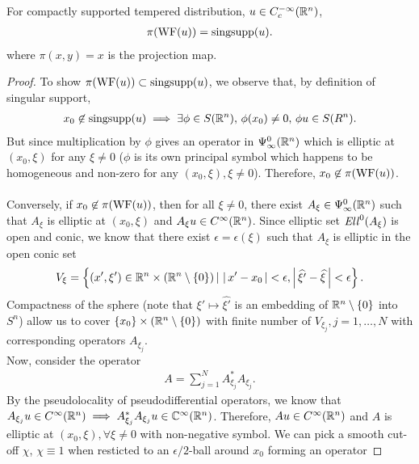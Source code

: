 \documentclass[12pt]{article}
\begin{document}
\begin{fprop}
    For compactly supported tempered distribution, $u \in C^{-\infty}_c({\mathbb R}^n)$, 
    \begin{align*}
    \pi(\mathrm{WF}(u)) = \mathrm{singsupp}(u). 
    \end{align*}
    where $\pi(x, y) = x$ is the projection map. 
\end{fprop}
\begin{proof}
    To show $\pi(\mathrm{WF}(u)) \subset \mathrm{singsupp}(u)$, we observe that, by definition of singular support, 
    \begin{align*}
    x_0 \not \in \mathrm{singsupp}(u) \implies \exists \phi \in S({\mathbb R}^n), \, \phi(x_0) \neq 0, \, \phi u \in S(R^n). 
    \end{align*}
    But since multiplication by $\phi$ gives an operator in $\Psi^0_\infty({\mathbb R}^n)$ which is elliptic at $(x_0, \xi)$ for any $\xi \neq 0$ ($\phi$ is its own principal symbol which happens to be homogeneous and non-zero for any $(x_0, \xi), \xi \neq 0$). Therefore, $x_0 \not \in \pi(\mathrm{WF}(u))$. \\
    \\
    Conversely, if $x_0 \not\in \pi(\mathrm{WF}(u))$, then for all $\xi \neq 0$, there exist $A_\xi \in \Psi^0_\infty({\mathbb R}^n)$ such that $A_\xi$ is elliptic at $(x_0, \xi)$ and $A_\xi u \in C^\infty({\mathbb R}^n)$. Since elliptic set $\mathit{Ell}^0(A_\xi)$ is open and conic, we know that there exist $\epsilon = \epsilon(\xi)$ such that $A_\xi$ is elliptic in the open conic set
    \begin{align*}
    V_\xi = \left\{(x', \xi')\in {\ensuremath {\mathbb R}}^n \times ({\mathbb R}^n \setminus \left\{0\right\}) \, | \, \left|\, x' - x_0\,\right| < \epsilon, \left|\, \widehat{\xi'} - \widehat{\xi}\,\right| < \epsilon \right\}. 
    \end{align*}
    Compactness of the sphere (note that $\xi' \mapsto \widehat{\xi'}$ is an embedding of ${\mathbb R}^n \setminus \left\{0\right\}$ into $S^n$) allow us to cover $\left\{x_0\right\} \times ({\mathbb R}^n \setminus \left\{0\right\})$ with finite number of $V_{\xi_j}, j = 1, \dots, N$ with corresponding operators $A_{\xi_j}$. \\
    Now, consider the operator
    \begin{align*}
    A = \sum_{j = 1}^N A^*_{\xi_j}A_{\xi_j}. 
    \end{align*}
    By the pseudolocality of pseudodifferential operators, we know that $A_{\xi_j} u \in C^\infty({\mathbb R}^n) \implies A^*_{\xi_j} A_{\xi_j} u \in {\ensuremath {\mathbb C}}^\infty({\mathbb R}^n)$. Therefore, $Au \in C^\infty({\mathbb R}^n)$ and $A$ is elliptic at $(x_0, \xi), \forall \xi \neq 0$ with non-negative symbol. We can pick a smooth cut-off $\chi$, $\chi \equiv 1$ when resticted to an $\epsilon/2$-ball around $x_0$ forming an operator

\end{proof}
\end{document}
